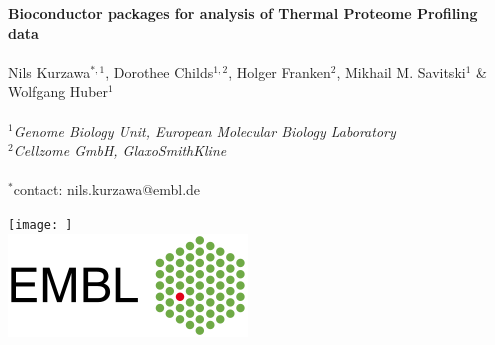 \documentclass{article}
\title{}
\author{}
\date{}
\begin{document}


\begin{center}
\colorbox{lgray}{
  \begin{minipage}{.865\textwidth}
      \vspace{0.4cm}
      \huge 
      \noindent
      \textbf{Bioconductor packages for analysis of Thermal Proteome Profiling data} \\
      \vspace{0.1cm} \\
      \Large Nils Kurzawa$^{*,1}$, Dorothee Childs$^{1,2}$, Holger Franken$^2$, Mikhail M. Savitski$^1$ \& Wolfgang Huber$^1$ \\
      \vspace{0.1cm} \\
      \Large \textit{$^1$Genome Biology Unit, European Molecular Biology Laboratory} \\
      \Large \textit{$^2$Cellzome GmbH, GlaxoSmithKline} \\
      \vspace{0.1cm} \\
      \vspace{0.4cm}
      \normalsize $^*$contact: nils.kurzawa@embl.de \\
      \hspace{1cm}
  \end{minipage}
  \begin{minipage}{3.7cm}
      \texttt{[image: ]} \\
      \vspace{0.5cm}
      \includegraphics[width=1.1\linewidth, right]{figs/embl_logo.png}
  \end{minipage}
}
\end{center}
\end{document}
